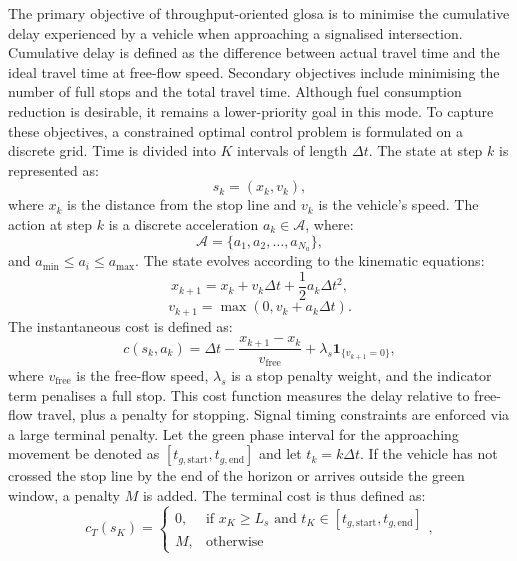 The primary objective of throughput-oriented \ac{glosa} is to minimise the cumulative delay experienced by a vehicle when approaching a signalised intersection. Cumulative delay is defined as the difference between actual travel time and the ideal travel time at free-flow speed. Secondary objectives include minimising the number of full stops and the total travel time. Although fuel consumption reduction is desirable, it remains a lower-priority goal in this mode.
\mynewline
To capture these objectives, a constrained optimal control problem is formulated on a discrete grid. Time is divided into $K$ intervals of length $\Delta t$. The state at step $k$ is represented as:
\begin{equation}
    s_k = \left(x_k, v_k\right),
\end{equation}
where $x_k$ is the distance from the stop line and $v_k$ is the vehicle's speed. The action at step $k$ is a discrete acceleration $a_k \in \mathcal{A}$, where:
\begin{equation}
    \mathcal{A} = \{a_1, a_2, \dots, a_{N_a}\},
\end{equation}
and $a_{\min} \le a_i \le a_{\max}$. The state evolves according to the kinematic equations:
\begin{equation}
    x_{k+1} = x_k + v_k\Delta t + \frac{1}{2}a_k\Delta t^2,
\end{equation}
\begin{equation}
    v_{k+1} = \max\left(0, v_k + a_k\Delta t\right).
\end{equation}
The instantaneous cost is defined as:
\begin{equation}
    c(s_k, a_k) = \Delta t - \frac{x_{k+1}-x_k}{v_{\mathrm{free}}} + \lambda_s\mathbf{1}_{\{v_{k+1}=0\}},
\end{equation}
where $v_{\mathrm{free}}$ is the free-flow speed, $\lambda_s$ is a stop penalty weight, and the indicator term penalises a full stop. This cost function measures the delay relative to free-flow travel, plus a penalty for stopping.
\mynewline
Signal timing constraints are enforced via a large terminal penalty. Let the green phase interval for the approaching movement be denoted as $[t_{g,\mathrm{start}}, t_{g,\mathrm{end}}]$ and let $t_k=k\Delta t$. If the vehicle has not crossed the stop line by the end of the horizon or arrives outside the green window, a penalty $M$ is added. The terminal cost is thus defined as:
\begin{equation}
c_T(s_K) =
\begin{cases}
0, & \text{if } x_K \ge L_s \text{ and } t_K\in[t_{g,\mathrm{start}},t_{g,\mathrm{end}}] \\
M, & \text{otherwise}
\end{cases}
,
\end{equation}

